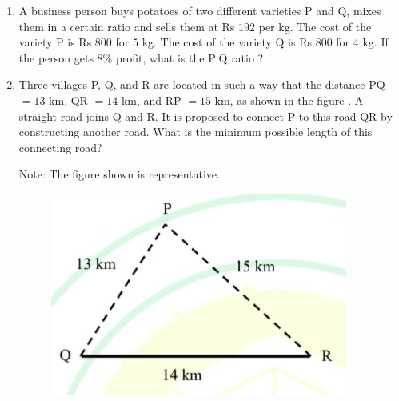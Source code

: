 \documentclass[journal,12pt,onecolumn]{article}
\theoremstyle{remark}
\begin{document}
\begin{enumerate}
    \hfill{}
    \begin{enumerate}
    \end{enumerate}

    \item A business person buys potatoes of two different varieties P and Q, mixes them in a certain ratio and sells them at Rs $192$ per kg.
    The cost of the variety P is Rs $800$ for $5$ kg.
    The cost of the variety Q is Rs $800$ for $4$ kg.
    If the person gets $8$\% profit, what is the P:Q ratio ?
    
    \hfill{}
    \begin{enumerate}
    \end{enumerate}

    \item Three villages P, Q, and R are located in such a way that the distance PQ $= 13$ km, QR $= 14$ km, and RP $= 15$ km, as shown in the figure . A straight road joins Q and R. It is proposed to connect P to this road QR by constructing another road. What is the minimum possible length  of this connecting road?
    
    Note: The figure shown is representative.
    \begin{figure}[H]
        \centering
        \includegraphics[width=0.7\columnwidth]{figs/2q-10.jpg}
        \caption{}
        \label{fig:q10}
    \end{figure}


\end{enumerate}
\end{document}
